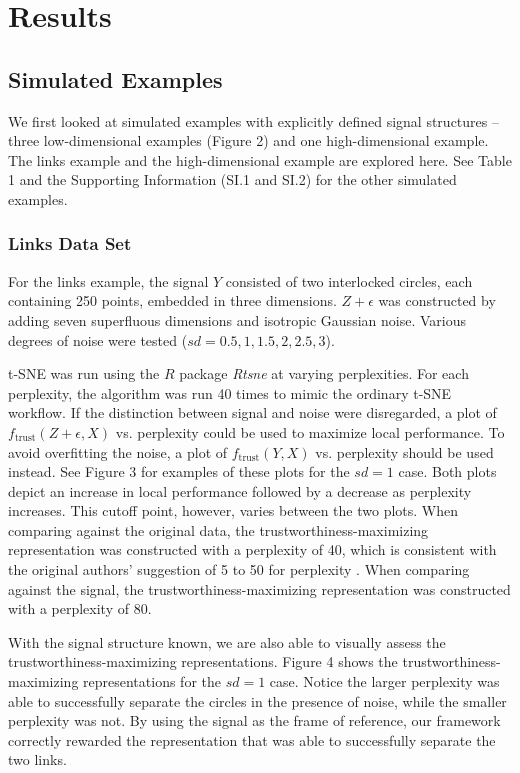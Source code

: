 \documentclass{article}
\begin{document}
\section{Results}

\subsection{Simulated Examples}
We first looked at simulated examples with explicitly defined signal structures -- three low-dimensional examples (Figure 2) and one high-dimensional example. The links example and the high-dimensional example are explored here. See Table 1 and the Supporting Information (SI.1 and SI.2) for the other simulated examples.

\subsubsection{Links Data Set}
For the links example, the signal $Y$ consisted of two interlocked circles, each containing 250 points, embedded in three dimensions. $Z + \epsilon$ was constructed by adding seven superfluous dimensions and isotropic Gaussian noise. Various degrees of noise were tested ($sd = 0.5, 1, 1.5, 2, 2.5, 3$).

t-SNE was run using the $R$ package \textit{Rtsne} \cite{Rtsne} at varying perplexities. For each perplexity, the algorithm was run 40 times to mimic the ordinary t-SNE workflow. If the distinction between signal and noise were disregarded, a plot of $f_\textrm{trust}(Z + \epsilon, X)$ vs. perplexity could be used to maximize local performance. To avoid overfitting the noise, a plot of $f_\textrm{trust}(Y, X)$ vs. perplexity should be used instead. See Figure 3 for examples of these plots for the $sd = 1$ case. Both plots depict an increase in local performance followed by a decrease as perplexity increases. This cutoff point, however, varies between the two plots. When comparing against the original data, the trustworthiness-maximizing representation was constructed with a perplexity of 40, which is consistent with the original authors' suggestion of 5 to 50 for perplexity \cite{t-SNE}. When comparing against the signal, the trustworthiness-maximizing representation was constructed with a perplexity of 80.

With the signal structure known, we are also able to visually assess the trustworthiness-maximizing representations. Figure 4 shows the trustworthiness-maximizing representations for the $sd = 1$ case. Notice the larger perplexity was able to successfully separate the circles in the presence of noise, while the smaller perplexity was not. By using the signal as the frame of reference, our framework correctly rewarded the representation that was able to successfully separate the two links.
\end{document}
